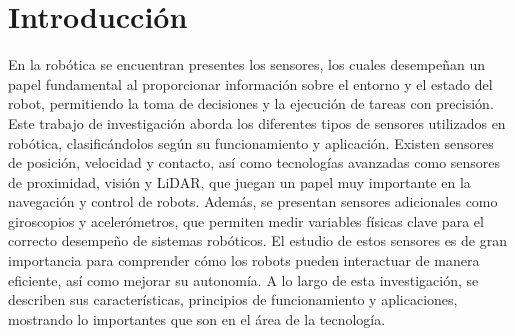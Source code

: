 \section{Introducción}
\vspace{10mm}
En la robótica se encuentran presentes los sensores, los cuales desempeñan un papel fundamental al proporcionar información sobre el entorno y el estado del robot, permitiendo la toma de decisiones y la ejecución de tareas con precisión. Este trabajo de investigación aborda los diferentes tipos de sensores utilizados en robótica, clasificándolos según su funcionamiento y aplicación.
Existen sensores de posición, velocidad y contacto, así como tecnologías avanzadas como sensores de proximidad, visión y LiDAR, que juegan un papel muy importante en la navegación y control de robots. Además, se presentan sensores adicionales como giroscopios y acelerómetros, que permiten medir variables físicas clave para el correcto desempeño de sistemas robóticos.
El estudio de estos sensores es de gran importancia para comprender cómo los robots pueden interactuar de manera eficiente, así como mejorar su autonomía. A lo largo de esta investigación, se describen sus características, principios de funcionamiento y aplicaciones, mostrando lo importantes que son en el área de la tecnología.

\newpage  %
